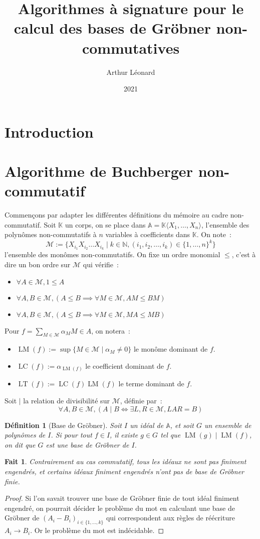 \documentclass{article}
\title{Algorithmes à signature pour le calcul des bases de Gröbner non-commutatives}
\author{Arthur Léonard}
\date{2021}
\newtheorem*{fact}{Fait}
\newtheorem*{dfn}{Définition}
\newcommand{\N}{\mathbb{N}}
\newcommand{\K}{\mathbb{K}}
\newcommand{\chev}[1]{\langle #1 \rangle}
\newcommand{\A}{\mathbb{A}}
\newcommand{\M}{\mathcal{M}}
\DeclareMathOperator{\LM}{LM}
\DeclareMathOperator{\LC}{LC}
\DeclareMathOperator{\LT}{LT}
\begin{document}
\maketitle

\section*{Introduction}

\section*{Algorithme de Buchberger non-commutatif}
Commençons par adapter les différentes définitions du mémoire au cadre non-commutatif.
Soit $\K$ un corps, on se place dans $\A = \K \chev{X_1, \dots, X_n}$, l'ensemble des polynômes non-commutatifs à $n$ variables à coefficients dans $\K$. On note~: 
$$\M := \{X_{i_1}X_{i_2} \dots X_{i_k} \;|\; k \in \N, (i_1, i_2, \dots, i_k) \in \{1, \dots, n\}^k \}$$
l'ensemble des monômes non-commutatifs. On fixe un ordre monomial $\leq$, c'est à dire un bon ordre sur $\M$ qui vérifie~:
\begin{itemize}
\item $\forall A \in \M, 1 \leq A$
\item $\forall A, B \in \M, (A \leq B \implies \forall M \in \M, AM \leq BM)$
\item $\forall A, B \in \M, (A \leq B \implies \forall M \in \M, MA \leq MB)$
\end{itemize}
Pour $f = \sum_{M \in \M} \alpha_M M \in A$, on notera~:
\begin{itemize}
\item $\LM(f) := \sup \{ M \in \M \;|\; \alpha_M \neq 0 \}$ le monôme dominant de $f$.
\item $\LC(f) := \alpha_{\LM(f)}$ le coefficient dominant de $f$.
\item $\LT(f) := \LC(f)\LM(f)$ le terme dominant de $f$.
\end{itemize}
Soit $|$ la relation de divisibilité sur $\M$, définie par~:
$$\forall A, B \in \M, (A \;|\; B \iff \exists L, R \in \M, LAR = B)$$

\begin{dfn}[Base de Gröbner]
	Soit $I$ un idéal de $\A$, et soit $G$ un ensemble de polynômes de $I$.
	Si pour tout $f \in I$, il existe $g \in G$ tel que $\LM(g) \;|\; \LM(f)$, on dit que $G$ est une base de Gröbner de $I$.
\end{dfn}

\begin{fact}
	Contrairement au cas commutatif, tous les idéaux ne sont pas finiment engendrés, et certains idéaux finiment engendrés n'ont pas de base de Gröbner finie.
\end{fact}
\begin{proof}
	Si l'on savait trouver une base de Gröbner finie de tout idéal finiment engendré, on pourrait décider le problème du mot en calculant une base de Gröbner de $(A_i - B_i)_{i \in \{1, \dots, k\}}$ qui correspondent aux règles de réécriture $A_i \rightarrow B_i$. 
	Or le problème du mot est indécidable.
\end{proof}
\end{document}

